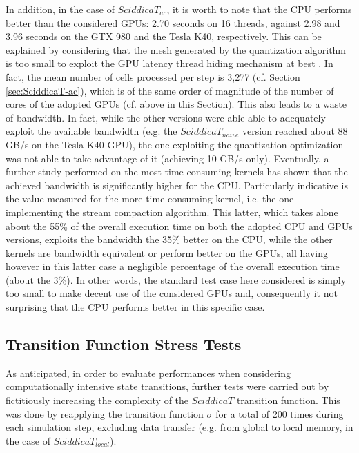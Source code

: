 In addition, in the case of $SciddicaT_{ac}$, it is worth to note
that the CPU performs better than the considered GPUs: 2.70
seconds on 16 threads, against 2.98 and 3.96 seconds on the GTX
980 and the Tesla K40, respectively. This can be explained by
considering that the mesh generated by the quantization algorithm
is too small to exploit the GPU latency thread hiding mechanism at
best \cite{Kirk2010}. In fact, the mean number of cells processed
per step is 3,277 (cf. Section \ref{sec:SciddicaT-ac}),
which is of the same order of magnitude of the number of cores of
the adopted GPUs (cf. above in this Section). This also leads to a
waste of bandwidth. In fact, while the other versions were able
able to adequately exploit the available bandwidth (e.g. the
$SciddicaT_{naive}$ version reached about 88 GB/s on the Tesla K40
GPU), the one exploiting the quantization optimization was not
able to take advantage of it (achieving 10 GB/s only). Eventually,
a further study performed on the most time consuming kernels has
shown that the achieved bandwidth is significantly higher for the
CPU. Particularly indicative is the value measured for the more
time consuming kernel, i.e. the one implementing the stream
compaction algorithm. This latter, which takes alone about the
55\% of the overall execution time on both the adopted CPU and
GPUs versions, exploits the bandwidth the 35\% better on the CPU,
while the other kernels are bandwidth equivalent or perform better
on the GPUs, all having however in this latter case a negligible
percentage of the overall execution time (about the 3\%). In other
words, the standard test case here considered is simply too small
to make decent use of the considered GPUs and, consequently it not
surprising that the CPU performs better in this specific case.

\subsection{Transition Function Stress Tests}    
As anticipated, in order to evaluate performances when considering
computationally intensive state transitions, further tests were
carried out by fictitiously increasing the complexity of the
$SciddicaT$ transition function. This was done by reapplying the
transition function $\sigma$ for a total of 200 times during each
simulation step, excluding data transfer (e.g. from global to
local memory, in the case of $SciddicaT_{local}$).

